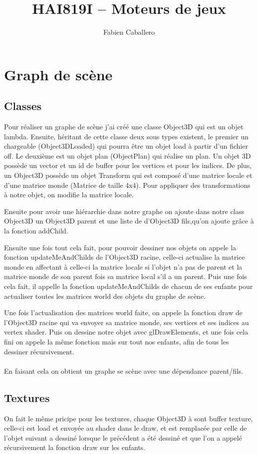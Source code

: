 \documentclass{article}
\title{HAI819I – Moteurs de jeux
}
\author{Fabien Caballero}
\begin{document}
\maketitle
    \tableofcontents

\newpage
\section{Graph de scène}
\subsection{Classes}
  Pour réaliser un graphe de scène j'ai créé une classe Object3D qui est un objet lambda. Ensuite, héritant de cette classe deux sous types existent, le premier un chargeable (Object3DLoaded) qui pourra être un objet load à partir d'un fichier off. Le deuxième est un objet plan (ObjectPlan) qui réalise un plan.
  Un objet 3D possède un vector et un id de buffer pour les vertices et pour les indices.
  De plus, un Object3D possède un objet Transform qui est composé d'une matrice locale et d'une matrice monde (Matrice de taille 4x4).
  Pour appliquer des transformations à notre objet, on modifie la matrice locale.

  Ensuite pour avoir une hiérarchie dans notre graphe on ajoute dans notre class Object3D un Object3D parent et une liste de d'Object3D fils,qu'on ajoute grâce à la fonction addChild.

  Ensuite une fois tout cela fait, pour pouvoir dessiner nos objets on appele la fonction updateMeAndChilds de l'Object3D racine, celle-ci actualise la matrice monde en affectant à celle-ci la matrice locale si l'objet n'a pas de parent et la matrice monde de son parent fois sa matrice local s'il a un parent.
  Puis une fois cela fait, il appelle la fonction updateMeAndChilds de chacun de ses enfants pour actualiser toutes les matrices world des objets du graphe de scène.

  Une fois l'actualisation des matrices world faite, on appele la fonction draw de l'Object3D racine qui va envoyer sa matrice monde, ses vertices et ses indices au vertex shader. Puis on dessine notre objet avec glDrawElements, et une fois cela fini on appele la même fonction mais sur tout nos enfants, afin de tous les dessiner récursivement.
  \\\\
  En faisant cela on obtient un graphe se scène avec une dépendance parent/fils.

\subsection{Textures}
  On fait le même pricipe pour les textures, chaque Object3D à sont buffer texture, celle-ci est load et envoyée au shader dans le draw, et est remplacée par celle de l'objet suivant a dessiné lorsque le précédent a été dessiné et que l'on a appelé récursivement la fonction draw sur les enfants.
\end{document}
